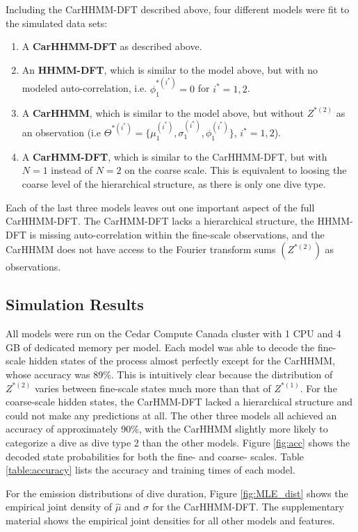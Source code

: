 Including the CarHHMM-DFT described above, four different models were fit to the simulated data sets:
\begin{enumerate}
    \item A \textbf{CarHHMM-DFT} as described above.
    \item An \textbf{HHMM-DFT}, which is similar to the model above, but with no modeled auto-correlation, i.e. $\phi_1^{*(i^*)} = 0$ for $i^* = 1,2$.
    \item A \textbf{CarHHMM}, which is similar to the model above, but without $Z^{*(2)}$ as an observation (i.e $\Theta^{*(i^*)} = \{\mu_1^{(i^*)},\sigma_1^{(i^*)},\phi_1^{(i^*)}\}$, $i^* = 1,2$).
    \item A \textbf{CarHMM-DFT}, which is similar to the CarHHMM-DFT, but with $N=1$ instead of $N=2$ on the coarse scale. This is equivalent to loosing the coarse level of the hierarchical structure, as there is only one dive type.
\end{enumerate}
%
Each of the last three models leaves out one important aspect of the full CarHHMM-DFT. The CarHMM-DFT lacks a hierarchical structure, the HHMM-DFT is missing auto-correlation within the fine-scale observations, and the CarHHMM does not have access to the Fourier transform sums $(Z^{*(2)})$ as observations. 

\subsection{Simulation Results}

All models were run on the Cedar Compute Canada cluster with 1 CPU and 4 GB of dedicated memory per model.
Each model was able to decode the fine-scale hidden states of the process almost perfectly except for the CarHHMM, whose accuracy was 89\%. This is intuitively clear because the distribution of $Z^{*(2)}$ varies between fine-scale states much more than that of $Z^{*(1)}$. For the coarse-scale hidden states, the CarHMM-DFT lacked a hierarchical structure and could not make any predictions at all. The other three models all achieved an accuracy of approximately 90\%, with the CarHHMM slightly more likely to categorize a dive as dive type 2 than the other models. Figure \ref{fig:acc} shows the decoded state probabilities for both the fine- and coarse- scales. Table \ref{table:accuracy} lists the accuracy and training times of each model.

For the emission distributions of dive duration, Figure \ref{fig:MLE_dist} shows the empirical joint density of $\hat \mu$ and $\hat \sigma$ for the CarHHMM-DFT. The supplementary material shows the empirical joint densities for all other models and features.

